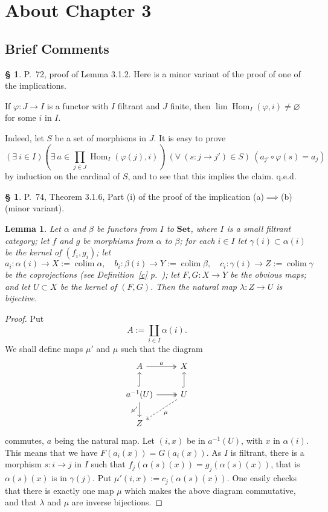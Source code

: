 \documentclass[12pt]{article}
\newtheorem{lem}[thm]{Lemma}
\theoremstyle{remark}
\theoremstyle{definition}
\newtheorem{s}[thm]{\S}
\newcommand{\Set}{\mathbf{Set}}
\newcommand{\mv}{ (minor variant)}
\DeclareMathOperator*{\coli}{colim}
\DeclareMathOperator{\Hom}{Hom}%
\begin{document}
\section{About Chapter 3}
%
\subsection{Brief Comments}
%
\begin{s} 
P.~72, proof of Lemma 3.1.2. Here is a minor variant of the proof of one of the implications. 

If $\varphi:J\to I$ is a functor with $I$ filtrant and $J$ finite, then $\lim\Hom_I(\varphi,i)\neq\varnothing$ for some $i$ in $I$. 

Indeed, let $S$ be a set of morphisms in $J$. It is easy to prove 
$$
(\exists\ i\in I)\left(\exists\ a\in\prod_{j\in J}\Hom_I(\varphi(j),i)\right)\ (\forall\ (s:j\to j')\in S)\ (a_{j'}\circ\varphi(s)=a_j) 
$$ 
by induction on the cardinal of $S$, and to see that this implies the claim. q.e.d.
\end{s}
%
%
\begin{s} 
P.~74, Theorem 3.1.6, Part (i) of the proof of the implication (a)$\implies$(b)\mv. 
%
\begin{lem} 
Let $\alpha$ and $\beta$ be functors from $I$ to $\Set$, where $I$ is a small filtrant category; let $f$ and $g$ be morphisms from $\alpha$ to $\beta$; for each $i\in I$ let $\gamma(i)\subset\alpha(i)$ be the kernel of $(f_i,g_i)$; let 
$$
a_i:\alpha(i)\to X:=\coli\alpha,\quad 
b_i:\beta(i)\to Y:=\coli\beta,\quad 
c_i:\gamma(i)\to Z:=\coli\gamma
$$ 
be the coprojections (see Definition~\ref{c} p.~\pageref{c}); let $F,G:X\to Y$ be the obvious maps; and let $U\subset X$ be the kernel of $(F,G)$. Then the natural map $\lambda:Z\to U$ is bijective.
\end{lem}
%
\begin{proof}
Put 
$$
A:=\coprod_{i\in I}\alpha(i).
$$
We shall define maps $\mu'$ and $\mu$ such that the diagram
$$
\begin{tikzcd}
A\ar[two heads]{r}{a}&X\\ 
a^{-1}(U)\ar[hook]{u}\ar{d}[swap]{\mu'}\ar[two heads]{r}&U\ar[hook]{u}\ar[dashed]{dl}{\mu}\\ 
Z
\end{tikzcd}
$$ 
commutes, $a$ being the natural map. Let $(i,x)$ be in $a^{-1}(U)$, with $x$ in $\alpha(i)$. This means that we have $F(a_i(x))=G(a_i(x))$. As $I$ is filtrant, there is a morphism $s:i\to j$ in $I$ such that $f_j(\alpha(s)(x))=g_j(\alpha(s)(x))$, that is $\alpha(s)(x)$ is in $\gamma(j)$. Put $\mu'(i,x):=c_j(\alpha(s)(x))$. One easily checks that there is exactly one map $\mu$ which makes the above diagram commutative, and that $\lambda$ and $\mu$ are inverse bijections.
\end{proof}
\end{s}
\end{document}
